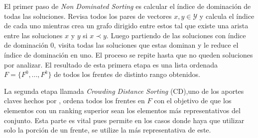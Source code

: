 El primer paso de \textit{Non Dominated Sorting} es calcular el \'indice de dominaci\'on de todas las soluciones. Revisa todos los pares de vectores $x, y \in \mathcal{Y}$ y calcula el \'indice  de cada uno mientras crea un grafo dirigido entre estos tal que existe una arista entre las soluciones $x$ y $y$ si $x \prec y$. Luego partiendo de las soluciones con \'indice de dominaci\'on 0, visita todas las soluciones que estas dominan y le reduce el \'indice de dominaci\'on en uno. El proceso se repite hasta que no queden soluciones por analizar.
El resultado de esta primera etapa es una lista ordenada  $F = \{F^0, ..., F^k\}$ de todos los frentes de distinto rango obtenidos. 


La segunda etapa llamada \textit{Crowding Distance Sorting} (CD),uno de los aportes claves hechos por \cite{deb2002fast}, ordena todos los frentes en $F$ con el objetivo de que los elementos con un ranking superior sean los elementos m\'as representativos del conjunto. Esta parte es vital pues permite en los casos donde haya que utilizar solo la porci\'on de un frente, se utilize la m\'as representativa de este. 

